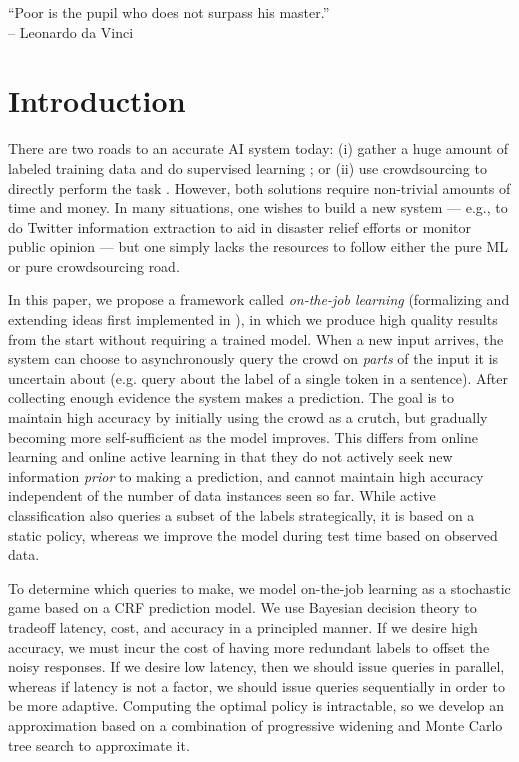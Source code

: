\begin{epigraph}
``Poor is the pupil who does not surpass his master.''\\
-- Leonardo da Vinci
\end{epigraph}

\section{Introduction}
\label{sec:intro}

There are two roads to an accurate AI system today:
(i) gather a huge amount of labeled training data \citep{deng2009imagenet} and do supervised learning \citep{krizhevsky2012imagenet};
or (ii) use crowdsourcing to directly perform the task \citep{bernstein2010soylent,kokkalis2013emailvalet}.
However, both solutions require non-trivial amounts of time and money.
In many situations, one wishes to build a new system --- e.g., to do Twitter information extraction
\citep{li2012twiner} to aid in disaster relief efforts or monitor public
opinion --- but one simply lacks the resources to follow either the pure ML or pure crowdsourcing road.

In this paper, we propose a framework called \emph{on-the-job learning} (formalizing and extending ideas first implemented in \citep{lasecki2013real}),
in which we produce high quality results from the start without requiring a trained model.
When a new input arrives,
the system can choose to asynchronously query the crowd on \emph{parts} of the input it is
uncertain about (e.g. query about the label of a single token in a sentence). After collecting enough evidence the system makes a prediction.
The goal is to maintain high accuracy by initially using the crowd as a crutch,
but gradually becoming more self-sufficient as the model improves.
This differs from online learning \citep{cesabianchi06prediction} and
online active learning \citep{helmbold1997some,sculley2007online,chu2011unbiased}
in that
they do not actively seek new information \emph{prior} to making a prediction,
and cannot maintain high accuracy independent of the number of data instances seen so far.
While active classification \citep{gao2011active}
also queries a subset of the labels strategically,
it is based on a static policy, 
whereas we improve the model during test time based on observed data.

To determine which queries to make,
we model on-the-job learning as a stochastic game based on a CRF prediction model.
We use Bayesian decision theory to tradeoff latency, cost, and accuracy in a principled manner.
If we desire high accuracy, we must incur the cost of having more redundant labels
to offset the noisy responses.  If we desire low latency, then we should issue queries
in parallel, whereas if latency is not a factor, we should issue queries
sequentially in order to be more adaptive.
Computing the optimal policy is intractable,
so we develop an approximation
based on a combination of progressive widening \citep{coulom2007computing}
and Monte Carlo tree search \citep{kocsis2006bandit} to approximate it.

